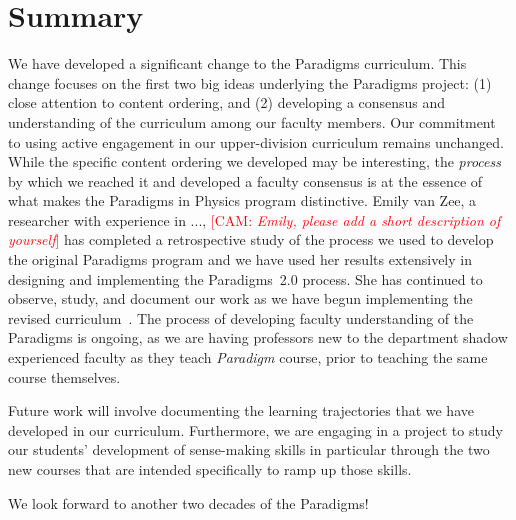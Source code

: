 \documentclass[english,aps,pra,reprint,noshowpacs,superscriptaddress]{revtex4-1}
\newcommand\corinnesays[1]{\textcolor{red}{[\sc CAM: {\em#1}]}}
\begin{document}
\section{Summary}
We have developed a significant change to the Paradigms
curriculum.  This change focuses on the first two big ideas underlying
the Paradigms project: (1) close attention to content ordering, and (2)
developing a consensus and understanding of the curriculum among our
faculty members.  Our commitment to using active engagement in our
upper-division curriculum remains unchanged.  While the specific
content ordering we developed may be interesting, the \emph{process} by
which we reached it and developed a faculty consensus is at the
essence of what makes the Paradigms in Physics program distinctive.
Emily van Zee, a researcher with experience in ..., 
\corinnesays{Emily, please add a short description of yourself} 
has completed a retrospective study of the process we used to develop the 
original Paradigms program and we have used her results extensively in 
designing and implementing the Paradigms~2.0 process.  She has continued 
to observe, study, and document our work as we have begun implementing 
the revised curriculum~\cite{lessonslearned}.
The process of developing faculty understanding of the Paradigms is
ongoing, as we are having professors new to the department shadow
experienced faculty as they teach \emph{Paradigm} course, prior to teaching
the same course themselves.  

Future work will involve documenting the learning trajectories that we
have developed in our curriculum.  Furthermore, we are engaging in a
project to study our students' development of sense-making skills in
particular through the two new courses that are intended specifically
to ramp up those skills.

We look forward to another two decades of the Paradigms!




\end{document}
